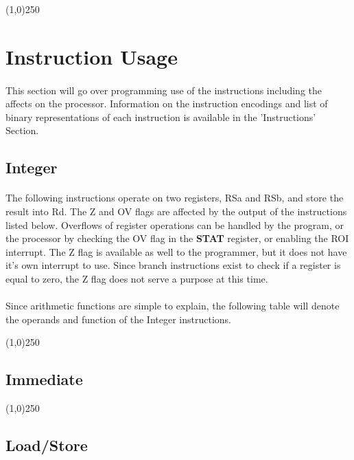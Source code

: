 \documentclass[letterpaper, 11pt]{article}
\begin{document}
\begin{center}
	\line(1,0){250}
\end{center}

\clearpage
\section{Instruction Usage}
\paragraph{}This section will go over programming use of the instructions including the affects on the processor. Information on the 
instruction encodings and list of binary representations of each instruction is available in the 'Instructions' Section.
\subsection{Integer}
\paragraph{} The following instructions operate on two registers, RSa and RSb, and store the result into Rd. The Z and OV flags are affected
by the output of the instructions listed below. Overflows of register operations can be handled by the program, or the processor by checking the
OV flag in the \textbf{STAT} register, or enabling the ROI interrupt. The Z flag is available as well to the programmer, but it does not have
it's own interrupt to use. Since branch instructions exist to check if a register is equal to zero, the Z flag does not serve a purpose at this time.
\paragraph{} Since arithmetic functions are simple to explain, the following table will denote the operands and function of the Integer instructions. 

\begin{center}
	\line(1,0){250}
\end{center}

\subsection{Immediate}

\begin{center}
	\line(1,0){250}
\end{center}
\subsection{Load/Store}
\end{document}
